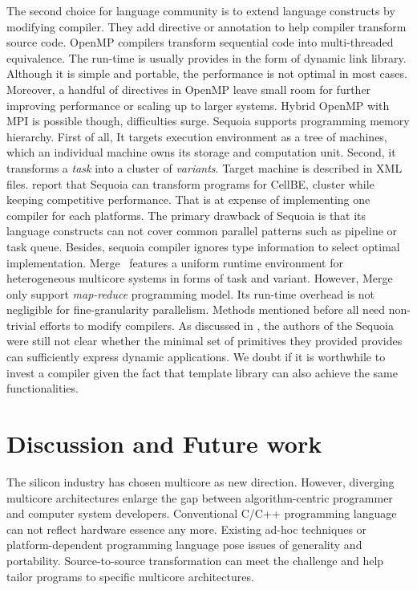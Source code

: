 \documentclass[10pt, conference, compsocconf]{IEEEtran}
\begin{document}
The second choice for language community is to extend language constructs by
modifying compiler. They add directive or annotation to help compiler
transform source code. OpenMP compilers transform sequential code into
multi-threaded equivalence. The run-time is usually provides in the form of dynamic link library. Although it is simple and
portable, the performance is not optimal in most cases. Moreover, a
handful of directives in OpenMP leave small room for further improving
performance or scaling up to larger systems. Hybrid OpenMP with MPI is
possible though, difficulties surge. Sequoia supports
programming memory hierarchy. First of all, It targets execution
environment as a tree of machines, which an individual machine owns
its storage and computation unit. Second, it transforms a
\textit{task} into a
cluster of \emph{variants}. Target machine
is described in XML files. \cite{sequoia,
  sequoia-compiler} report  that Sequoia can transform programs
for CellBE, cluster while keeping competitive performance. That
is at expense of implementing one compiler for each platforms.
The primary drawback of Sequoia is that its language constructs can not cover common
parallel patterns such as pipeline or task queue. Besides, sequoia compiler
ignores type information to select optimal
implementation. Merge~\cite{merge} features a uniform runtime
environment for heterogeneous multicore 
systems in forms of task and variant. However, Merge only
support \emph{map-reduce} programming model. Its run-time overhead is not negligible for fine-granularity
parallelism. Methods mentioned before all need non-trivial efforts to
modify compilers. As discussed in \cite{sequoia}, the authors of the Sequoia were
still not clear whether the minimal set of primitives they provided provides can
sufficiently express dynamic applications. We doubt if it is worthwhile to
invest a compiler given the fact that template library can also
achieve the same functionalities.

\section{Discussion and Future work}
The silicon industry has chosen multicore as new
direction. However, diverging multicore architectures enlarge the gap between algorithm-centric programmer and
computer system developers.  Conventional C/C++ programming language
can not reflect hardware essence any more.  Existing ad-hoc techniques
or platform-dependent programming language pose issues of generality
and portability. Source-to-source transformation can meet the challenge
and help tailor programs to specific multicore architectures.
\end{document}
